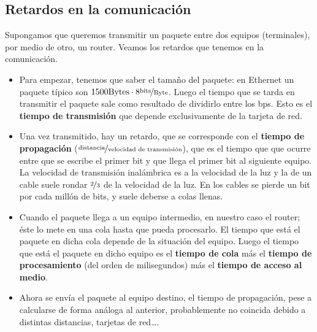 \subsection{Retardos en la comunicación}
Supongamos que queremos transmitir un paquete entre dos equipos (terminales), por medio de otro, un router. Veamos los retardos que tenemos en la comunicación. 
\begin{itemize}
    \item Para empezar, tenemos que saber el tamaño del paquete: en Ethernet un paquete típico son $1500 \text{Bytes}\cdot 8\nicefrac{\text{bits}}{\text{Byte}}$. Luego el tiempo que se tarda en transmitir el paquete sale como resultado de dividirlo entre los bps. Esto es el \textbf{tiempo de transmisión} que depende exclusivamente de la tarjeta de red. 
    \item Una vez transmitido, hay un retardo, que se corresponde con el \textbf{tiempo de propagación} ($\nicefrac{\text{distancia}}{\text{velocidad de transmisión}}$), que es el tiempo que que ocurre entre que se escribe el primer bit y que llega el primer bit al siguiente equipo. La velocidad de transmisión inalámbrica es a la velocidad de la luz y la de un cable suele rondar $\nicefrac{2}{3}$ de la velocidad de la luz. En los cables se pierde un bit por cada millón de bits, y suele deberse a colas llenas. 
    \item Cuando el paquete llega a un equipo intermedio, en nuestro caso el router; éste lo mete en una cola hasta que pueda procesarlo. El tiempo que está el paquete en dicha cola depende de la situación del equipo. Luego el tiempo que está el paquete en dicho equipo es el \textbf{tiempo de cola} más el \textbf{tiempo de procesamiento} (del orden de milisegundos) más el \textbf{tiempo de acceso al medio}.
    \item Ahora se envía el paquete al equipo destino, el tiempo de propagación, pese a calcularse de forma análoga al anterior, probablemente no coincida debido a distintas distancias, tarjetas de red\ldots. 
\end{itemize}

